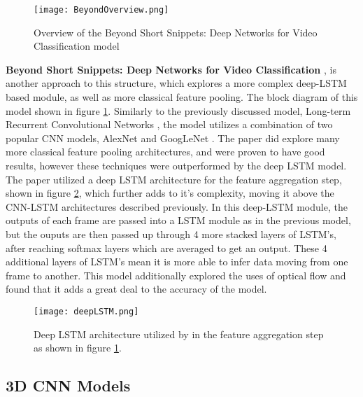 \begin{figure}[ht]
	\texttt{[image: BeyondOverview.png]}
	\centering
	\caption{Overview of the Beyond Short Snippets: Deep Networks for Video Classification model \cite{beyondshortsnippets}}
	\label{fig:beyondoverview}
\end{figure}

\textbf{Beyond Short Snippets: Deep Networks for Video Classification} \cite{beyondshortsnippets}, is another approach to this structure, which explores a more complex deep-LSTM based module, as well as more classical feature pooling. The block diagram of this model shown in figure \ref{fig:beyondoverview}. Similarly to the previously discussed model, Long-term Recurrent Convolutional Networks \cite{LRCNS}, the model utilizes a combination of two popular CNN models, AlexNet \cite{alexnet} and GoogLeNet \cite{googlenet}. The paper did explore many more classical feature pooling architectures, and were proven to have good results, however these techniques were outperformed by the deep LSTM model. The paper utilized a deep LSTM architecture for the feature aggregation step, shown in figure \ref{fig:deeplstm}, which further adds to it's complexity, moving it above the CNN-LSTM architectures described previously. In this deep-LSTM module, the outputs of each frame are passed into a LSTM module as in the previous model, but the ouputs are then passed up through 4 more stacked layers of LSTM's, after reaching softmax layers which are averaged to get an output. These 4 additional layers of LSTM's mean it is more able to infer data moving from one frame to another. This model additionally explored the uses of optical flow and found that it adds a great deal to the accuracy of the model.

\begin{figure}[ht]
	\texttt{[image: deepLSTM.png]}
	\centering
	\caption{Deep LSTM architecture utilized by \cite{beyondshortsnippets} in the feature aggregation step as shown in figure \ref{fig:beyondoverview}.}
	\label{fig:deeplstm}
\end{figure}

\subsection{3D CNN Models}
\label{sec:3dCNNModels}

